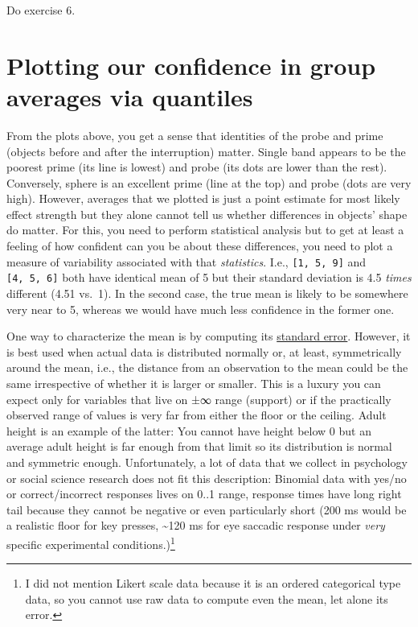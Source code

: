 \documentclass[
]{book}
\begin{document}
Do exercise 6.

\hypertarget{plotting-our-confidence-in-group-averages-via-quantiles}{%
\section{Plotting our confidence in group averages via quantiles}\label{plotting-our-confidence-in-group-averages-via-quantiles}}

From the plots above, you get a sense that identities of the probe and prime (objects before and after the interruption) matter. Single band appears to be the poorest prime (its line is lowest) and probe (its dots are lower than the rest). Conversely, sphere is an excellent prime (line at the top) and probe (dots are very high). However, averages that we plotted is just a point estimate for most likely effect strength but they alone cannot tell us whether differences in objects' shape do matter. For this, you need to perform statistical analysis but to get at least a feeling of how confident can you be about these differences, you need to plot a measure of variability associated with that \emph{statistics}. I.e., \texttt{{[}1,\ 5,\ 9{]}} and \texttt{{[}4,\ 5,\ 6{]}} both have identical mean of 5 but their standard deviation is 4.5 \emph{times} different (4.51 vs.~1). In the second case, the true mean is likely to be somewhere very near to 5, whereas we would have much less confidence in the former one.

One way to characterize the mean is by computing its \href{https://en.wikipedia.org/wiki/Standard_error}{standard error}. However, it is best used when actual data is distributed normally or, at least, symmetrically around the mean, i.e., the distance from an observation to the mean could be the same irrespective of whether it is larger or smaller. This is a luxury you can expect only for variables that live on ±∞ range (support) or if the practically observed range of values is very far from either the floor or the ceiling. Adult height is an example of the latter: You cannot have height below 0 but an average adult height is far enough from that limit so its distribution is normal and symmetric enough. Unfortunately, a lot of data that we collect in psychology or social science research does not fit this description: Binomial data with yes/no or correct/incorrect responses lives on 0..1 range, response times have long right tail because they cannot be negative or even particularly short (200 ms would be a realistic floor for key presses, \textasciitilde120 ms for eye saccadic response under \emph{very} specific experimental conditions.)\footnote{I did not mention Likert scale data because it is an ordered categorical type data, so you cannot use raw data to compute even the mean, let alone its error.}
\end{document}
